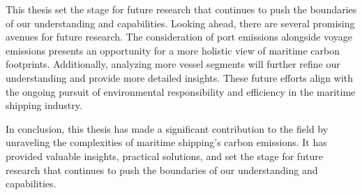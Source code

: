 This thesis set the stage for future research that continues to push the boundaries of our understanding and capabilities. 
Looking ahead, there are several promising avenues for future research. 
The consideration of port emissions alongside voyage emissions presents an opportunity for a more holistic view of maritime carbon footprints. 
Additionally, analyzing more vessel segments will further refine our understanding and provide more detailed insights. 
These future efforts align with the ongoing pursuit of environmental responsibility and efficiency in the maritime shipping industry.

In conclusion, this thesis has made a significant contribution to the field by unraveling the complexities of maritime shipping's carbon emissions. 
It has provided valuable insights, practical solutions, and set the stage for future research that continues to push the boundaries of our understanding and capabilities.

